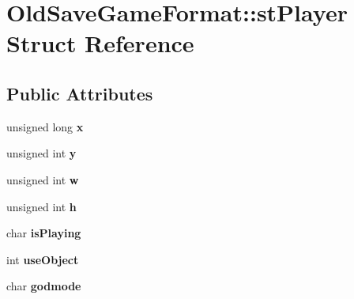 \hypertarget{struct_old_save_game_format_1_1st_player}{
\section{OldSaveGameFormat::stPlayer Struct Reference}
\label{struct_old_save_game_format_1_1st_player}
}
\subsection*{Public Attributes}
\begin{DoxyCompactItemize}
\item 
\hypertarget{struct_old_save_game_format_1_1st_player_a03fcd93d5f76926fa157469fae5b32b8}{
unsigned long {\bfseries x}}
\label{struct_old_save_game_format_1_1st_player_a03fcd93d5f76926fa157469fae5b32b8}

\item 
\hypertarget{struct_old_save_game_format_1_1st_player_a38a881f327a91b6627f78428a89254fa}{
unsigned int {\bfseries y}}
\label{struct_old_save_game_format_1_1st_player_a38a881f327a91b6627f78428a89254fa}

\item 
\hypertarget{struct_old_save_game_format_1_1st_player_a8c478cedcb9c0eef8cc01f504e0e20c7}{
unsigned int {\bfseries w}}
\label{struct_old_save_game_format_1_1st_player_a8c478cedcb9c0eef8cc01f504e0e20c7}

\item 
\hypertarget{struct_old_save_game_format_1_1st_player_a91d8e2e552c754bdadab739807463375}{
unsigned int {\bfseries h}}
\label{struct_old_save_game_format_1_1st_player_a91d8e2e552c754bdadab739807463375}

\item 
\hypertarget{struct_old_save_game_format_1_1st_player_a53fcc96e03fcd8c217364721d43a6f29}{
char {\bfseries isPlaying}}
\label{struct_old_save_game_format_1_1st_player_a53fcc96e03fcd8c217364721d43a6f29}

\item 
\hypertarget{struct_old_save_game_format_1_1st_player_a5ea1682f00275e5bb60833997db822d4}{
int {\bfseries useObject}}
\label{struct_old_save_game_format_1_1st_player_a5ea1682f00275e5bb60833997db822d4}

\item 
\hypertarget{struct_old_save_game_format_1_1st_player_a9d6a7bd8d6986d9c245021f67da7c941}{
char {\bfseries godmode}}
\label{struct_old_save_game_format_1_1st_player_a9d6a7bd8d6986d9c245021f67da7c941}


\end{DoxyCompactItemize}

